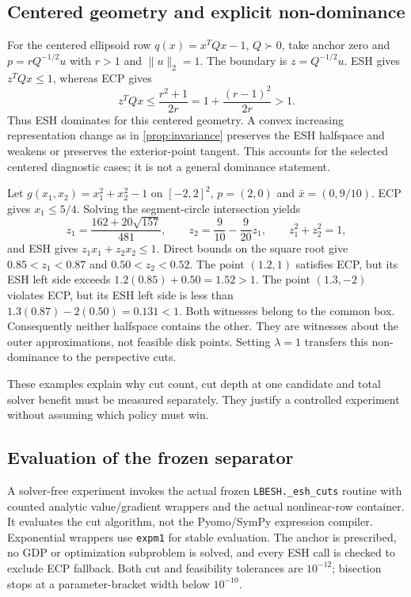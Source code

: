 \subsection{Centered geometry and explicit non-dominance}
For the centered ellipsoid row $q(x)=x^TQx-1$, $Q\succ0$, take anchor zero and $p=rQ^{-1/2}u$ with $r>1$ and $\|u\|_2=1$. The boundary is $z=Q^{-1/2}u$. ESH gives $z^TQx\le1$, whereas ECP gives
\[
 z^TQx\le\frac{r^2+1}{2r}=1+\frac{(r-1)^2}{2r}>1.
\]
Thus ESH dominates for this centered geometry. A convex increasing representation change as in \cref{prop:invariance} preserves the ESH halfspace and weakens or preserves the exterior-point tangent. This accounts for the selected centered diagnostic cases; it is not a general dominance statement.

\begin{example}\label{ex:nondominance}
Let $g(x_1,x_2)=x_1^2+x_2^2-1$ on $[-2,2]^2$, $p=(2,0)$ and $\bar x=(0,9/10)$. ECP gives $x_1\le5/4$. Solving the segment-circle intersection yields
\[
 z_1=\frac{162+20\sqrt{157}}{481},\qquad
 z_2=\frac9{10}-\frac9{20}z_1,
 \qquad z_1^2+z_2^2=1,
\]
and ESH gives $z_1x_1+z_2x_2\le1$. Direct bounds on the square root give $0.85<z_1<0.87$ and $0.50<z_2<0.52$. The point $(1.2,1)$ satisfies ECP, but its ESH left side exceeds $1.2(0.85)+0.50=1.52>1$. The point $(1.3,-2)$ violates ECP, but its ESH left side is less than $1.3(0.87)-2(0.50)=0.131<1$. Both witnesses belong to the common box. Consequently neither halfspace contains the other. They are witnesses about the outer approximations, not feasible disk points. Setting $\lambda=1$ transfers this non-dominance to the perspective cuts.
\end{example}
These examples explain why cut count, cut depth at one candidate and total solver benefit must be measured separately. They justify a controlled experiment without assuming which policy must win.

\subsection{Evaluation of the frozen separator}\label{sec:oracle-empirical}
A solver-free experiment invokes the actual frozen \texttt{LBESH.\_esh\_cuts} routine with counted analytic value/gradient wrappers and the actual nonlinear-row container. It evaluates the cut algorithm, not the Pyomo/SymPy expression compiler. Exponential wrappers use \texttt{expm1} for stable evaluation. The anchor is prescribed, no GDP or optimization subproblem is solved, and every ESH call is checked to exclude ECP fallback. Both cut and feasibility tolerances are $10^{-12}$; bisection stops at a parameter-bracket width below $10^{-10}$.

